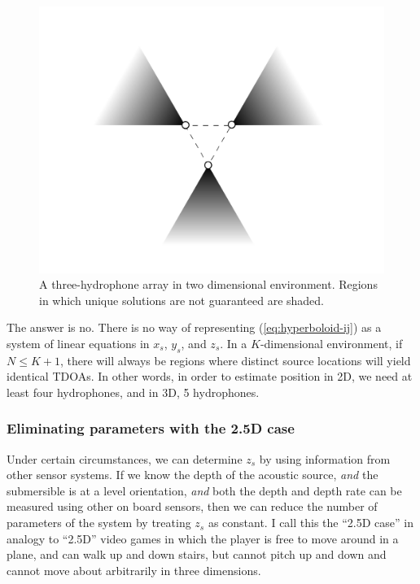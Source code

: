 \documentclass[10pt]{article}
\begin{document}
\begin{figure}[htbp]
\begin{center}
\includegraphics[scale=0.25]{bad-zones.pdf}
\caption{A three-hydrophone array in two dimensional environment.  Regions in which unique solutions are not guaranteed are shaded.}
\label{fig:bad-zones}
\end{center}
\end{figure}

The answer is no.  There is no way of representing (\ref{eq:hyperboloid-ij}) as a system of linear equations in \(x_s\), \(y_s\), and \(z_s\).  In a \(K\)-dimensional environment, if \(N{\leq}K+1\), there will always be regions where distinct source locations will yield identical TDOAs.  In other words, in order to estimate position in 2D, we need at least four hydrophones, and in 3D, 5 hydrophones.

\subsubsection{Eliminating parameters with the 2.5D case}

Under certain circumstances, we can determine \(z_s\) by using information from other sensor systems.  If we know the depth of the acoustic source, \emph{and} the submersible is at a level orientation, \emph{and} both the depth and depth rate can be measured using other on board sensors, then we can reduce the number of parameters of the system by treating \(z_s\) as constant.  I call this the ``2.5D case'' in analogy to ``2.5D'' video games in which the player is free to move around in a plane, and can walk up and down stairs, but cannot pitch up and down and cannot move about arbitrarily in three dimensions.
\end{document}
